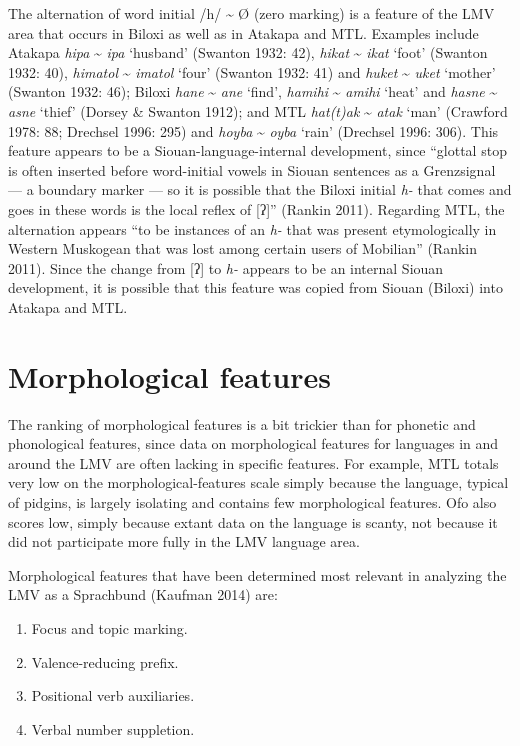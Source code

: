 \documentclass[output=paper]{LSP/langsci}
\begin{document}
The alternation of word initial /h/ \textasciitilde{} Ø (zero marking) is a feature of the LMV area that occurs in Biloxi as well as in Atakapa and MTL. Examples include Atakapa \emph{hipa} \textasciitilde{} \emph{ipa} `husband' (Swanton 1932: 42), \emph{hikat} \textasciitilde{} \emph{ikat} `foot' (Swanton 1932: 40), \emph{himatol} \textasciitilde{} \emph{imatol} `four' (Swanton 1932: 41) and \emph{huket} \textasciitilde{} \emph{uket} `mother' (Swanton 1932: 46); Biloxi \emph{hane} \textasciitilde{} \emph{ane} `find', \emph{hamihi} \textasciitilde{} \emph{amihi} `heat' and \emph{hasne} \textasciitilde{} \emph{asne} `thief' (Dorsey \& Swanton 1912); and MTL \emph{hat(t)ak} \textasciitilde{} \emph{atak} `man' (Crawford 1978: 88; Drechsel 1996: 295) and \emph{hoyba} \textasciitilde{} \emph{oyba} `rain' (Drechsel 1996: 306). This feature appears to be a Siouan-language-internal development, since “glottal stop is often inserted before word-initial vowels in Siouan sentences as a Grenzsignal — a boundary marker — so it is possible that the Biloxi initial \emph{h-} that comes and goes in these words is the local reflex of [ʔ]”  (Rankin 2011). Regarding MTL, the alternation appears “to be instances of an \emph{h-} that was present etymologically in Western Muskogean that was lost among certain users of Mobilian” (Rankin 2011). Since the change from [ʔ] to \emph{h-} appears to be an internal Siouan development, it is possible that this feature was copied from Siouan (Biloxi) into Atakapa and MTL. 

\section{Morphological features}

The ranking of morphological features is a bit trickier than for phonetic and phonological features, since data on morphological features for languages in and around the LMV are often lacking in specific features. For example, MTL totals very low on the morphological-features scale simply because the language, typical of pidgins, is largely isolating and contains few morphological features. Ofo also scores low, simply because extant data on the language is scanty, not because it did not participate more fully in the LMV language area.

	Morphological features that have been determined most relevant in analyzing the LMV as a Sprachbund (Kaufman 2014) are:

\begin{enumerate}
\item{Focus and topic marking.}
\item{Valence-reducing prefix.}
\item{Positional verb auxiliaries.}
\item{Verbal number suppletion.}
\end{enumerate}
 
\end{document}
